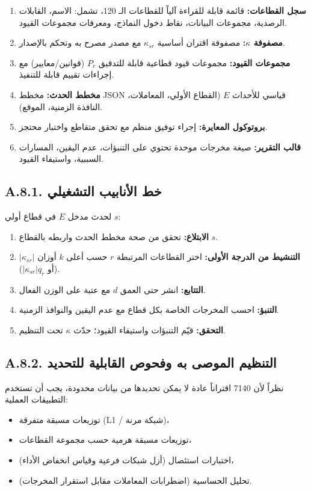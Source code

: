 \documentclass[13pt,a4paper]{article}
\begin{document}
	\begin{enumerate}[leftmargin=*]
		\item \textbf{سجل القطاعات:} قائمة قابلة للقراءة آلياً للقطاعات الـ 120، تشمل: الاسم، القابلات الرصدية، مجموعات البيانات، نقاط دخول النماذج، ومعرفات مجموعات القيود.
		\item \textbf{مصفوفة $\kappa$:} مصفوفة اقتران أساسية $\kappa_{sr}$ مع مصدر مصرح به وتحكم بالإصدار.
		\item \textbf{مجموعات القيود:} مجموعات قيود قطاعية قابلة للتدقيق $P_r$ (قوانين/معايير) مع إجراءات تقييم قابلة للتنفيذ.
		\item \textbf{مخطط الحدث:} مخطط JSON قياسي للأحداث $E$ (القطاع الأولي، المعاملات، النافذة الزمنية، الموقع).
		\item \textbf{بروتوكول المعايرة:} إجراء توفيق منظم مع تحقق متقاطع واختبار محتجز.
		\item \textbf{قالب التقرير:} صيغة مخرجات موحدة تحتوي على التنبؤات، عدم اليقين، المسارات السببية، واستيفاء القيود.
	\end{enumerate}
	
	\subsection*{A.8.1. خط الأنابيب التشغيلي}
	لحدث مدخل $E$ في قطاع أولي $s$:
	\begin{enumerate}[leftmargin=*]
		\item \textbf{الابتلاع:} تحقق من صحة مخطط الحدث واربطه بالقطاع $s$.
		\item \textbf{التنشيط من الدرجة الأولى:} اختر القطاعات المرتبطة $r$ حسب أعلى $k$ أوزان $|\kappa_{sr}|$ (أو $|\kappa_{sr}|q_r$).
		\item \textbf{التتابع:} انشر حتى العمق $d$ مع عتبة على الوزن الفعال.
		\item \textbf{التنبؤ:} احسب المخرجات الخاصة بكل قطاع مع عدم اليقين والنوافذ الزمنية.
		\item \textbf{التحقق:} قيّم التنبؤات واستيفاء القيود؛ حدّث $\kappa$ تحت التنظيم.
	\end{enumerate}
	
	\subsection*{A.8.2. التنظيم الموصى به وفحوص القابلية للتحديد}
	نظراً لأن 7140 اقتراناً عادة لا يمكن تحديدها من بيانات محدودة، يجب أن تستخدم التطبيقات العملية:
	\begin{itemize}[leftmargin=*]
		\item توزيعات مسبقة متفرقة (L1 / شبكة مرنة)،
		\item توزيعات مسبقة هرمية حسب مجموعة القطاعات،
		\item اختبارات استئصال (أزل شبكات فرعية وقياس انخفاض الأداء)،
		\item تحليل الحساسية (اضطرابات المعاملات مقابل استقرار المخرجات).
	\end{itemize}
	
\end{document}
